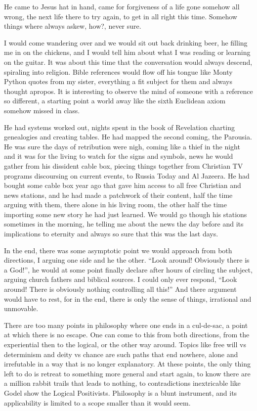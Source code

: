 \documentclass[ebook, 10pt, openright, onecolumn]{memoir}
\begin{document}
He came to Jesus hat in hand, came for forgiveness of a life gone somehow all
wrong, the next life there to try again, to get in all right this time.  Somehow
things where always askew, how?, never sure.

I would come wandering over and we would sit out back drinking beer, he filling
me in on the chickens, and I would tell him about what I was reading or learning
on the guitar.  It was about this time that the conversation would always
descend, spiraling into religion.  Bible references would flow off his tongue
like Monty Python quotes from my sister, everything a fit subject for them and
always thought apropos.  It is interesting to observe the mind of someone with a
reference so different, a starting point a world away like the sixth Euclidean
axiom somehow missed in class.

He had systems worked out, nights spent in the book of Revelation charting
genealogies and creating tables.  He had mapped the second coming, the Parousia.
He was sure the days of retribution were nigh, coming like a thief in the night
and it was for the living to watch for the signs and symbols, news he would
gather from his dissident cable box, piecing things together from Christian
TV programs discoursing on current events, to Russia Today and Al Jazeera.  He
had bought some cable box year ago that gave him access to all free Christian
and news stations, and he had made a patchwork of their content, half the time
arguing with them, there alone in his living room, the other half the time
importing some new story he had just learned.  We would go though his stations
sometimes in the morning, he telling me about the news the day before and its
implications to eternity and always so sure that this was the last days.

In the end, there was some asymptotic point we would approach from both
directions, I arguing one side and he the other. ``Look around! Obviously there
is a God!'', he would at some point finally declare after hours of circling the
subject, arguing church fathers and biblical sources.  I could only ever
respond, ``Look around! There is obviously nothing controlling all this!'' And
there argument would have to rest, for in the end, there is only the sense of
things, irrational and unmovable.

There are too many points in philosophy where one ends in a cul-de-sac, a point
at which there is no escape.  One can come to this from both directions, from
the experiential then to the logical, or the other way around.  Topics like free
will vs determinism and deity vs chance are such paths that end nowhere, alone
and irrefutable in a way that is no longer explanatory.  At these points, the
only thing left to do is retreat to something more general and start again, to
know there are a million rabbit trails that leads to nothing, to contradictions
inextricable like Godel show the Logical Positivists.  Philosophy is a blunt
instrument, and its applicability is limited to a scope smaller than it would
seem. 
\end{document}
